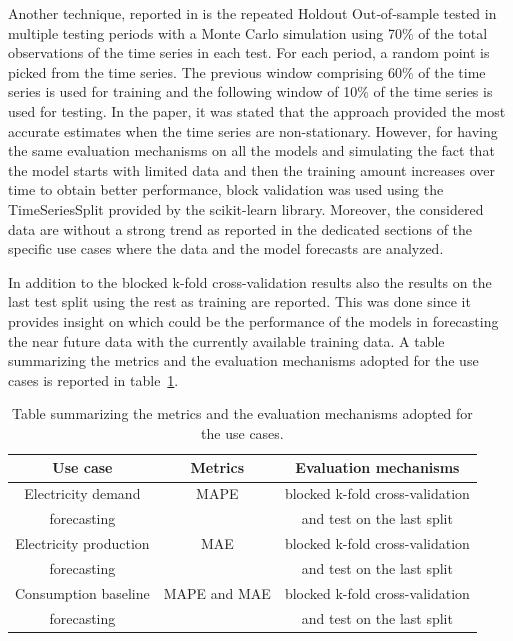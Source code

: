 Another technique, reported in \cite{Cerqueira2020} is the repeated Holdout Out‐of‐sample tested in multiple testing periods with a Monte Carlo simulation using 70\% of the total observations of the time series in each test.
For each period, a random point is picked from the time series.
The previous window comprising 60\% of the time series is used for training and the following window of 10\% of the time series is used for testing.
In the paper, it was stated that the approach provided the most accurate estimates when the time series are non-stationary.
However, for having the same evaluation mechanisms on all the models and simulating the fact that the model starts with limited data and then the training amount increases over time to obtain better performance, block validation was used using the TimeSeriesSplit provided by the scikit-learn library.
Moreover, the considered data are without a strong trend as reported in the dedicated sections of the specific use cases where the data and the model forecasts are analyzed.

In addition to the blocked k-fold cross-validation results also the results on the last test split using the rest as training are reported.
This was done since it provides insight on which could be the performance of the models in forecasting the near future data with the currently available training data.
A table summarizing the metrics and the evaluation mechanisms adopted for the use cases is reported in table~\ref{tab:metricstable}.

\begin{table}[H]
\centering
\begin{tabular}{|c|c|c|}
\hline
\textbf{Use case} & \textbf{Metrics} & \textbf{Evaluation mechanisms}\\
\hline
Electricity demand & MAPE & blocked k-fold cross-validation\\
forecasting & & and test on the last split\\
\hline
Electricity production & MAE & blocked k-fold cross-validation\\
forecasting & & and test on the last split\\
\hline
Consumption baseline & MAPE and MAE & blocked k-fold cross-validation\\
forecasting & & and test on the last split\\
\hline
\end{tabular}
\caption{Table summarizing the metrics and the evaluation mechanisms adopted for the use cases.}
\label{tab:metricstable}
\end{table}

